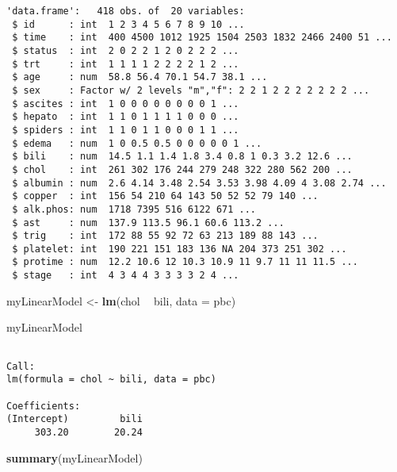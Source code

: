 \documentclass[12pt,letterpaperpaper,openany]{book}
\newenvironment{Shaded}{\begin{snugshade}}{\end{snugshade}}
\newcommand{\DataTypeTok}[1]{\textcolor[rgb]{0.13,0.29,0.53}{#1}}
\newcommand{\KeywordTok}[1]{\textcolor[rgb]{0.13,0.29,0.53}{\textbf{#1}}}
\newcommand{\NormalTok}[1]{#1}
\newcommand{\OperatorTok}[1]{\textcolor[rgb]{0.81,0.36,0.00}{\textbf{#1}}}
\newcommand{\StringTok}[1]{\textcolor[rgb]{0.31,0.60,0.02}{#1}}
\begin{document}
\begin{verbatim}
'data.frame':   418 obs. of  20 variables:
 $ id      : int  1 2 3 4 5 6 7 8 9 10 ...
 $ time    : int  400 4500 1012 1925 1504 2503 1832 2466 2400 51 ...
 $ status  : int  2 0 2 2 1 2 0 2 2 2 ...
 $ trt     : int  1 1 1 1 2 2 2 2 1 2 ...
 $ age     : num  58.8 56.4 70.1 54.7 38.1 ...
 $ sex     : Factor w/ 2 levels "m","f": 2 2 1 2 2 2 2 2 2 2 ...
 $ ascites : int  1 0 0 0 0 0 0 0 0 1 ...
 $ hepato  : int  1 1 0 1 1 1 1 0 0 0 ...
 $ spiders : int  1 1 0 1 1 0 0 0 1 1 ...
 $ edema   : num  1 0 0.5 0.5 0 0 0 0 0 1 ...
 $ bili    : num  14.5 1.1 1.4 1.8 3.4 0.8 1 0.3 3.2 12.6 ...
 $ chol    : int  261 302 176 244 279 248 322 280 562 200 ...
 $ albumin : num  2.6 4.14 3.48 2.54 3.53 3.98 4.09 4 3.08 2.74 ...
 $ copper  : int  156 54 210 64 143 50 52 52 79 140 ...
 $ alk.phos: num  1718 7395 516 6122 671 ...
 $ ast     : num  137.9 113.5 96.1 60.6 113.2 ...
 $ trig    : int  172 88 55 92 72 63 213 189 88 143 ...
 $ platelet: int  190 221 151 183 136 NA 204 373 251 302 ...
 $ protime : num  12.2 10.6 12 10.3 10.9 11 9.7 11 11 11.5 ...
 $ stage   : int  4 3 4 4 3 3 3 3 2 4 ...
\end{verbatim}

\begin{Shaded}
\begin{Highlighting}[]
\NormalTok{myLinearModel <-}\StringTok{ }\KeywordTok{lm}\NormalTok{(chol }\OperatorTok{~}\StringTok{ }\NormalTok{bili, }\DataTypeTok{data =}\NormalTok{ pbc)}
\end{Highlighting}
\end{Shaded}

\begin{Shaded}
\begin{Highlighting}[]
\NormalTok{myLinearModel}
\end{Highlighting}
\end{Shaded}

\begin{verbatim}

Call:
lm(formula = chol ~ bili, data = pbc)

Coefficients:
(Intercept)         bili  
     303.20        20.24  
\end{verbatim}

\begin{Shaded}
\begin{Highlighting}[]
\KeywordTok{summary}\NormalTok{(myLinearModel)}
\end{Highlighting}
\end{Shaded}
\end{document}
